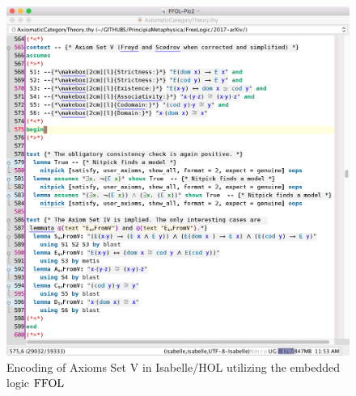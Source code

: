 \begin{figure}[htp]
 \includegraphics[width=\textwidth]{FFOL-Pic2}
 \caption{Encoding of Axioms Set V in Isabelle/HOL utilizing the
   embedded logic $\text{\textrm{FFOL}}$ \label{pic2}}
\end{figure}




